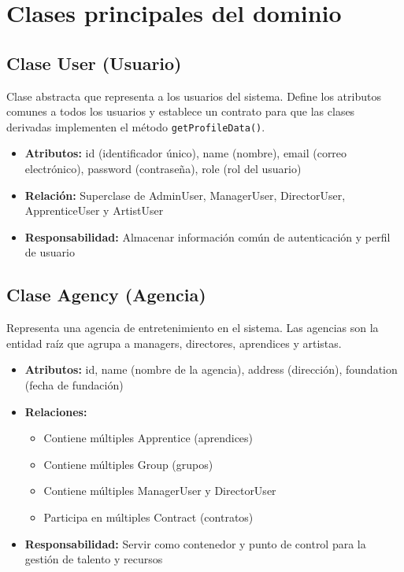 \documentclass[12pt,a4paper,spanish,oneside]{report}
\begin{document}
\section{Clases principales del dominio}

\subsection{Clase User (Usuario)}
Clase abstracta que representa a los usuarios del sistema. Define los atributos comunes a todos los usuarios y establece un contrato para que las clases derivadas implementen el método \texttt{getProfileData()}.

\begin{itemize}
	\item \textbf{Atributos:} id (identificador único), name (nombre), email (correo electrónico), password (contraseña), role (rol del usuario)
	\item \textbf{Relación:} Superclase de AdminUser, ManagerUser, DirectorUser, ApprenticeUser y ArtistUser
	\item \textbf{Responsabilidad:} Almacenar información común de autenticación y perfil de usuario
\end{itemize}

\subsection{Clase Agency (Agencia)}
Representa una agencia de entretenimiento en el sistema. Las agencias son la entidad raíz que agrupa a managers, directores, aprendices y artistas.

\begin{itemize}
	\item \textbf{Atributos:} id, name (nombre de la agencia), address (dirección), foundation (fecha de fundación)
	\item \textbf{Relaciones:} 
	\begin{itemize}
		\item Contiene múltiples Apprentice (aprendices)
		\item Contiene múltiples Group (grupos)
		\item Contiene múltiples ManagerUser y DirectorUser
		\item Participa en múltiples Contract (contratos)
	\end{itemize}
	\item \textbf{Responsabilidad:} Servir como contenedor y punto de control para la gestión de talento y recursos
\end{itemize}
\end{document}
